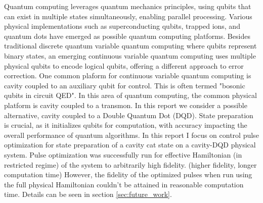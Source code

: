 \documentclass[12pt]{article}
\begin{document}
Quantum computing leverages quantum mechanics principles, using qubits that can exist in multiple states simultaneously, enabling parallel processing. 
Various physical implementations such as superconducting qubits, trapped ions, and quantum dots have emerged as possible quantum computing platforms.
Besides traditional discrete quantum variable quantum computing where qubits represent binary states, an emerging continuous variable quantum computing uses multiple physical qubits to encode logical qubits, offering a different approach to error correction. \cite{RevModPhys.77.513}
One common plaform for continuous variable quantum computing is cavity coupled to an auxiliary qubit for control.
This is often termed "bosonic qubits in circuit QED".\cite{Joshi_2021} In this area of quantum computing, the common physical platform is cavity coupled to a transmon. In this report we consider a possible alternative, cavity coupled to a Double Quantum Dot (DQD). \cite{D_Anjou_2019}
State preparation is crucial, as it initializes qubits for computation, with accuracy impacting the overall performance of quantum algorithms. \cite{Nielsen2010}
In this report I focus on control pulse optimization for state preparation of a cavity cat state on a cavity-DQD physical system. 
Pulse optimization was successfully run for effective Hamiltonian (in restricted regime) of the system to arbitrarily high fidelity. (higher fidelity, longer computation time)
However, the fidelity of the optimized pulses when run using the full physical Hamiltonian couldn't be attained in reasonable computation time. 
Details can be seen in section \ref{sec:future_work}.
\end{document}
